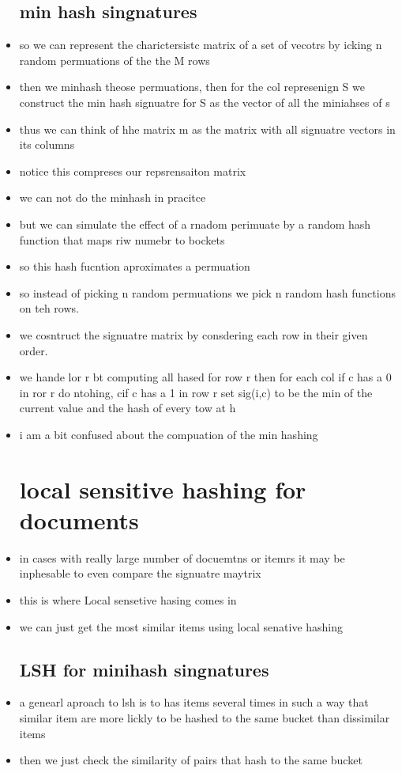 \documentclass{article}
\begin{document}
\begin{itemize}
\subsection*{min hash singnatures}
\item so we can represent the charictersistc matrix of a set of vecotrs by icking n random permuations of the the M rows 
\item then we minhash theose permuations, then for the col represenign S we construct the min hash signuatre for S as the vector of all the miniahses of s
\item thus we can think of hhe matrix m as the matrix with all signuatre vectors in its columns 
\item notice this compreses our repsrensaiton matrix 
\item we can not do the minhash in pracitce 
\item but we can simulate the effect of a rnadom perimuate by a random hash function that maps riw numebr to bockets 
\item so this hash fucntion aproximates a permuation 
\item so instead of picking n random permuations we pick n random hash functions on teh rows. 
\item we cosntruct the signuatre matrix by consdering each row in their given order. 
\item we hande lor r bt computing all hased for row r then for each col if c has a 0 in ror r do ntohing, cif c has a 1 in row r set sig(i,c) to be the min of the current value and the hash of every tow at h
\item i am a bit confused about the compuation of the min hashing
\section*{local sensitive hashing for documents}
\item in cases with really large number of docuemtns or itemrs 
it may be inphesable to even compare the signuatre maytrix
\item this is where Local sensetive hasing comes in 
\item we can just get the most similar items using local senative hashing 
\subsection*{LSH for minihash singnatures}
\item a genearl aproach to lsh is to has items several times in such a way that similar item are more lickly to be hashed to the same bucket than dissimilar items
\item then we just check the similarity of pairs that hash to the same bucket

\end{itemize}
\end{document}
